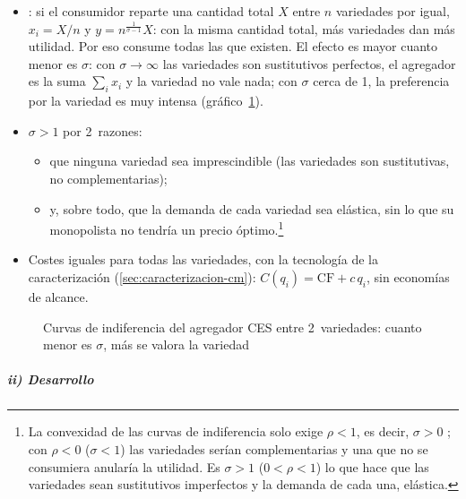 \documentclass[11pt]{article}
\begin{document}
\begin{itemize}
\item {}: si el consumidor reparte una cantidad total $X$ entre $n$ variedades por igual, $x_i=X/n$ y $y=n^{\frac{1}{\sigma-1}}X$: con la misma cantidad total, más variedades dan más utilidad. Por eso consume todas las que existen. El efecto es mayor cuanto menor es $\sigma$: con $\sigma\to\infty$ las variedades son sustitutivos perfectos, el agregador es la suma $\sum_ix_i$ y la variedad no vale nada; con $\sigma$ cerca de 1, la preferencia por la variedad es muy intensa (gráfico~\ref{fig:ces-variedad}).
\item $\sigma>1$ por 2~razones:
  \begin{itemize}
  \item que ninguna variedad sea imprescindible (las variedades son sustitutivas, no complementarias);
  \item y, sobre todo, que la demanda de cada variedad sea elástica, sin lo que su monopolista no tendría un precio óptimo.\footnote{La convexidad de las curvas de indiferencia solo exige $\rho<1$, es decir, $\sigma>0$ ; con $\rho<0$ ($\sigma<1$) las variedades serían complementarias y una que no se consumiera anularía la utilidad. Es $\sigma>1$ ($0<\rho<1$) lo que hace que las variedades sean sustitutivos imperfectos y la demanda de cada una, elástica.}
  \end{itemize}
\item Costes iguales para todas las variedades, con la tecnología de la caracterización (\ref{sec:caracterizacion-cm}): $C(q_i)=\mathrm{CF}+c\,q_i$, sin economías de alcance.
\end{itemize}

\begin{figure}[H]
\centering
\caption{Curvas de indiferencia del agregador CES entre 2~variedades: cuanto menor es $\sigma$, más se valora la variedad}\label{fig:ces-variedad}
\end{figure}

\subparagraph{ii) Desarrollo}
\end{document}
